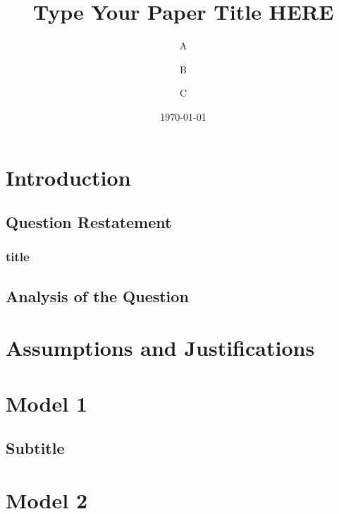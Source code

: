 \documentclass{mcmthesis}%
\title{Type Your Paper Title HERE  }  %
\author{A \and B \and C}
\date{\today}
\begin{document}
	\begin{abstract} %
		\small
	\begin{keywords}   %
			\footnotesize %
	\end{keywords}
	\end{abstract}
	
	\maketitle  %
	\tableofcontents %
	\clearpage  %
	\normalsize  %
	
	\section{Introduction}
    \subsection{ Question Restatement}
    \subsubsection{title}
    \subsection{Analysis of the Question}
    
	\section{ Assumptions and Justifications}
	
	\section{ Model 1}
	\subsection{ Subtitle}
	\section{Model 2}
\end{document}
